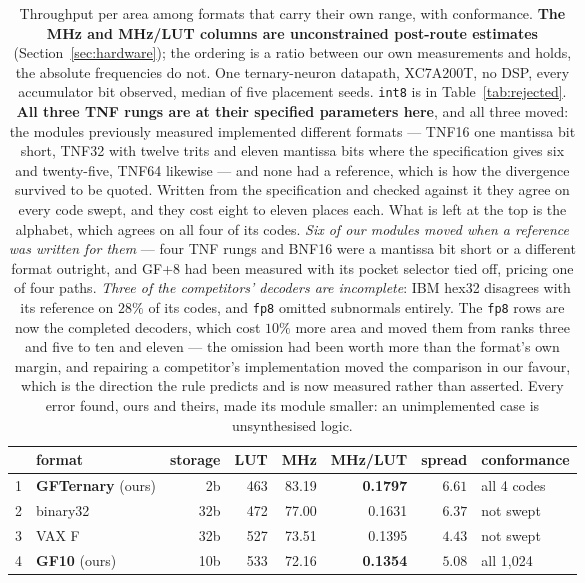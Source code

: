 \documentclass[11pt]{article}
\theoremstyle{definition}
\begin{document}
\begin{table}[t]\centering
\caption{Throughput per area among formats that carry their own range, with
conformance. \textbf{The MHz and MHz/LUT columns are unconstrained post-route
estimates} (Section~\ref{sec:hardware}); the ordering is a ratio between our own
measurements and holds, the absolute frequencies do not. One ternary-neuron datapath, XC7A200T, no DSP, every accumulator
bit observed, median of five placement seeds. \texttt{int8} is in
Table~\ref{tab:rejected}. \textbf{All three TNF rungs are at their specified
parameters here}, and all three moved: the modules previously measured
implemented different formats --- TNF16 one mantissa bit short, TNF32 with twelve
trits and eleven mantissa bits where the specification gives six and
twenty-five, TNF64 likewise --- and none had a reference, which is how the
divergence survived to be quoted. Written from the specification and checked
against it they agree on every code swept, and they cost eight to eleven places
each. What is left at the top is the alphabet, which agrees on all four of its
codes. \emph{Six of our modules moved when a reference was written for
them} --- four TNF rungs and BNF16 were a mantissa bit short or a different
format outright, and GF+8 had been measured with its pocket selector tied off,
pricing one of four paths. \emph{Three of the competitors' decoders are incomplete}: IBM hex32 disagrees with its reference on $28\%$ of its codes, and \texttt{fp8} omitted subnormals entirely. The
\texttt{fp8} rows are now the completed decoders, which cost $10\%$ more area
and moved them from ranks three and five to ten and eleven --- the omission had
been worth more than the format's own margin, and repairing a competitor's
implementation moved the comparison in our favour, which is the direction the
rule predicts and is now measured rather than asserted. Every error
found, ours and theirs, made its module smaller: an unimplemented case is
unsynthesised logic.}\label{tab:fullthroughput}
\small
\scriptsize
\begin{tabular}{rlrrrrrl}
\toprule
& format & storage & LUT & MHz & MHz/LUT & spread & conformance \\
\midrule
1 & \textbf{GFTernary} (ours) & 2b & 463 & 83.19 & \textbf{0.1797} & $6.61$ & all 4 codes \\
2 & binary32 & 32b & 472 & 77.00 & 0.1631 & $6.37$ & not swept \\
3 & VAX F & 32b & 527 & 73.51 & 0.1395 & $4.43$ & not swept \\
4 & \textbf{GF10} (ours) & 10b & 533 & 72.16 & \textbf{0.1354} & $5.08$ & all 1{,}024 \\

\end{tabular}
\end{table}
\end{document}
